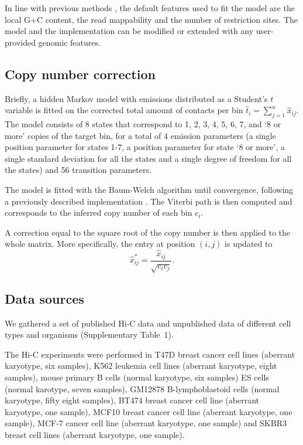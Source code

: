 \documentclass[a4,center,fleqn]{NAR}
\begin{document}
In line with previous methods
\citep{yaffe2011probabilistic,hu2012hicnorm}, the default features used to
fit the model are the local G+C content, the read mappability and the
number of restriction sites. The model and the implementation can be
modified or extended with any user-provided genomic features.

\subsection{Copy number correction}

Briefly, a hidden Markov model with emissions distributed as a Student's
$t$ variable is fitted on the corrected total amount of contacts per bin
$\hat{t}_i = \sum_{j=1}^n{\hat{x}_{ij}}$. The model consists of 8
states that correspond to 1, 2, 3, 4, 5, 6, 7, and `8 or more' copies of
the target bin, for a total of 4 emission parameters (a single position
parameter for states 1-7, a position parameter for state `8 or more', a
single standard deviation for all the states and a single degree of
freedom for all the states) and 56 transition parameters. 

The model is fitted with the Baum-Welch algorithm \citep{baum1966} until
convergence, following a previously described implementation
\citep{filion2010systematic}.  The Viterbi path is then computed and
corresponds to the inferred copy number of each bin $c_i$.

A correction equal to the square root of the copy number is then applied
to the whole matrix. More specifically, the entry at position $(i,j)$ is
updated to
\begin{equation}
\label{eq:cnvnorm}
\hat{x}_{ij}^* = \frac{\hat{x}_{ij}}{\sqrt{c_ic_j}}.
\end{equation}


\subsection{Data sources}

We gathered a set of published Hi-C data \citep[][BioRxiv:
https://doi.org/10.1101/132456]{ledily2014distinct, encode2012integrated,
rao20143d, lin2012global, dixon2012topological} and unpublished data of
different cell types and organisms (Supplementary Table~1).

The Hi-C experiments were performed in T47D breast cancer cell lines
(aberrant karyotype, six samples), K562 leukemia cell lines (aberrant
karyotype, eight samples), mouse primary B cells (normal karyotype, six
samples) ES cells (normal karotype, seven samples), GM12878
B-lymphoblastoid cells (normal karyotype, fifty eight samples), BT474
breast cancer cell line (aberrant karyotype, one sample), MCF10 breast
cancer cell line (aberrant karyotype, one sample), MCF-7 cancer cell line
(aberrant karyotype, one sample) and SKBR3 breast cell lines (aberrant
karyotype, one sample).
\end{document}
